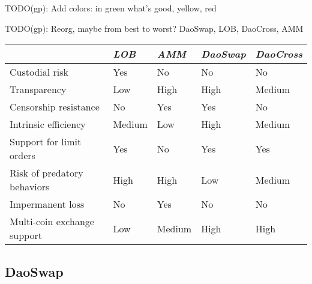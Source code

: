 \documentclass[11pt, reqno]{amsart}
\theoremstyle{definition}
\theoremstyle{remark}
\begin{document}
TODO(gp): Add colors: in green what's good, yellow, red

TODO(gp): Reorg, maybe from best to worst? DaoSwap, LOB, DaoCross, AMM

\begin{samepage}
	\begin{table}[h!]
		\centering
		\begin{tabular}{lllll}
			                            & \emph{LOB} & \emph{AMM} & \emph{DaoSwap} & \emph{DaoCross} \\
			\hline
			Custodial risk              & Yes        & No         & No             & No              \\
			Transparency                & Low        & High       & High           & Medium          \\
			Censorship resistance       & No         & Yes        & Yes            & No              \\
			Intrinsic efficiency        & Medium     & Low        & High           & Medium          \\
			Support for limit orders    & Yes        & No         & Yes            & Yes             \\
			Risk of predatory behaviors & High       & High       & Low            & Medium          \\
			Impermanent loss            & No         & Yes        & No             & No              \\
			Multi-coin exchange support & Low        & Medium     & High           & High            \\
			\hline
		\end{tabular}
	\end{table}
\end{samepage}

\subsection{DaoSwap}
\end{document}
